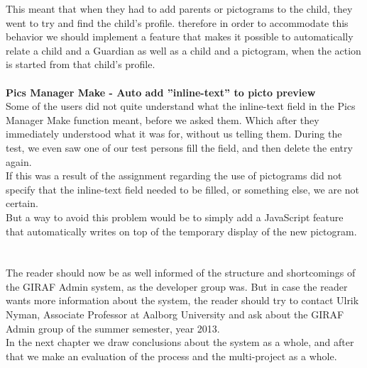 This meant that when they had to add parents or pictograms to the child, they went to try and find the child's profile. therefore in order to accommodate this behavior we should implement a feature that makes it possible to automatically relate a child and a Guardian as well as a child and a pictogram, when the action is started from that child's profile.\\
\\
\textbf{Pics Manager Make - Auto add ''inline-text'' to picto preview}\\
Some of the users did not quite understand what the inline-text field in the Pics Manager Make function meant, before we asked them. Which after they immediately understood what it was for, without us telling them. During the test, we even saw one of our test persons fill the field, and then delete the entry again.\\
If this was a result of the assignment regarding the use of pictograms did not specify that the inline-text field needed to be filled, or something else, we are not certain.\\
But a way to avoid this problem would be to simply add a JavaScript feature that automatically writes on top of the temporary display of the new pictogram.\\
\\
\\
The reader should now be as well informed of the structure and shortcomings of the GIRAF Admin system, as the developer group was. But in case the reader wants more information about the system, the reader should try to contact Ulrik Nyman, Associate Professor at Aalborg University and ask about the GIRAF Admin group of the summer semester, year 2013.\\
In the next chapter we draw conclusions about the system as a whole, and after that we make an evaluation of the process and the multi-project as a whole.


